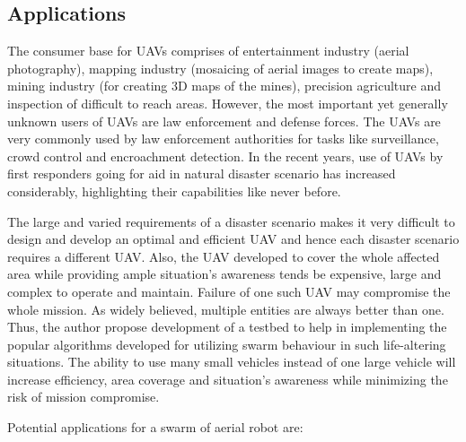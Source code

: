 \begin{spacing}{2}
\subsection*{Applications}

The consumer base for UAVs comprises of entertainment industry (aerial photography), mapping industry (mosaicing of aerial images to create maps), mining industry (for creating 3D maps of the mines), precision agriculture and inspection of difficult to reach areas. However, the most important yet generally unknown users of UAVs are law enforcement and defense forces. The UAVs are very commonly used by law enforcement authorities for tasks like surveillance, crowd control and encroachment detection. In the recent years, use of UAVs by first responders going for aid in natural disaster scenario has increased considerably, highlighting their capabilities like never before.

The large and varied requirements of a disaster scenario makes it very difficult to design and develop an optimal and efficient UAV and hence each disaster scenario requires a different UAV. Also, the UAV developed to cover the whole affected area while providing ample situation's awareness tends be expensive, large and complex to operate and maintain. Failure of one such UAV may compromise the whole mission. As widely believed, multiple entities are always better than one. Thus, the author propose development of a testbed to help in implementing the popular algorithms developed for utilizing swarm behaviour in such life-altering situations. The ability to use many small vehicles instead of one large vehicle will increase efficiency, area coverage and situation's awareness while minimizing the risk of mission compromise.

Potential applications for a swarm of aerial robot are:


\end{spacing}
